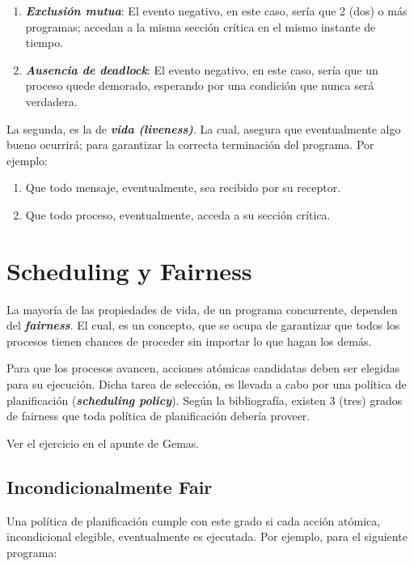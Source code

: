 \documentclass[a4paper, 10pt]{report}
\begin{document}
\begin{enumerate}
	\item \textbf{\emph{Exclusión mutua}}: El evento negativo, en este caso, sería que 2 (dos) o más programas; accedan a la misma sección crítica en el mismo instante de tiempo.
	\item \textbf{\emph{Ausencia de deadlock}}: El evento negativo, en este caso, sería que un proceso quede demorado, esperando por una condición que nunca será verdadera. 
\end{enumerate}

La segunda, es la de \textbf{\emph{vida (liveness)}}. La cual, asegura que eventualmente algo bueno ocurrirá; para garantizar la correcta terminación del programa. Por ejemplo:

\begin{enumerate}
	\item Que todo mensaje, eventualmente, sea recibido por su receptor.
	\item Que todo proceso, eventualmente, acceda a su sección crítica.
\end{enumerate}

\section{Scheduling y Fairness}

La mayoría de las propiedades de vida, de un programa concurrente, dependen del \textbf{\emph{fairness}}. El cual, es un concepto, que se ocupa de garantizar que todos los procesos tienen chances de proceder sin importar lo que hagan los demás.

Para que los procesos avancen, acciones atómicas candidatas deben ser elegidas para su ejecución. Dicha tarea de selección, es llevada a cabo por una política de planificación (\textbf{\emph{scheduling policy}}). Según la bibliografía, existen 3 (tres) grados de fairness que toda política de planificación debería proveer.

\begin{basic_box}
	 Ver el ejercicio en el apunte de Gemas.
\end{basic_box}

\subsection{Incondicionalmente Fair}

Una política de planificación cumple con este grado si cada acción atómica, incondicional elegible, eventualmente es ejecutada. Por ejemplo, para el siguiente programa:
\end{document}
